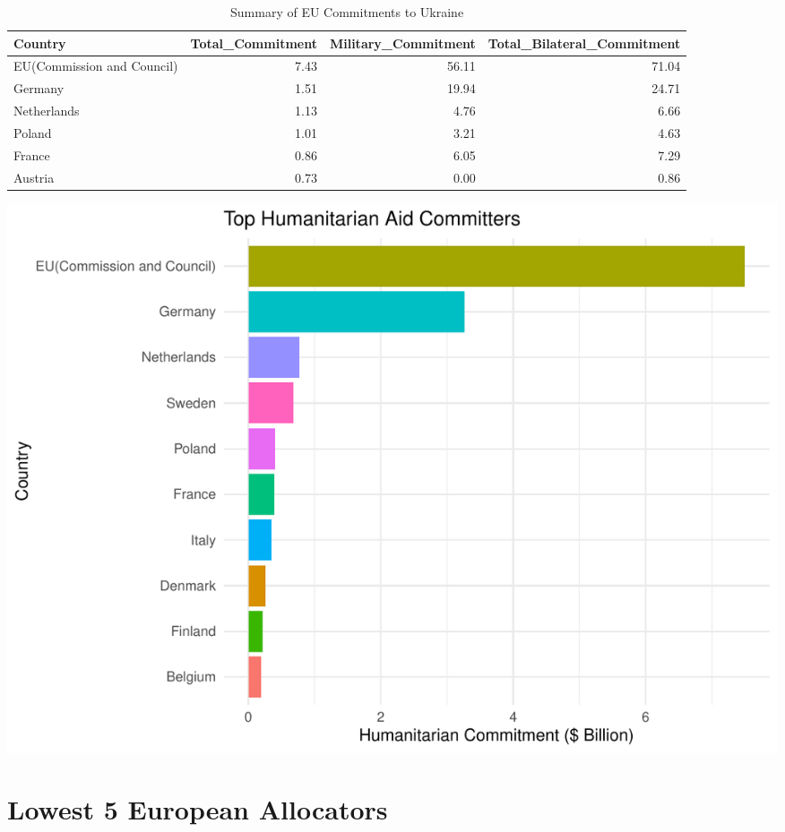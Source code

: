 \documentclass[12pt,preprint, authoryear]{elsarticle}
\let\origfigure\figure
\let\endorigfigure\endfigure
\renewenvironment{figure}[1][2] {
    \expandafter\origfigure\expandafter[H]
} {
    \endorigfigure
}
\numberwithin{equation}{section}
\numberwithin{figure}{section}
\numberwithin{table}{section}
\begin{document}
\begingroup\fontsize{11pt}{12pt}\selectfont
\begin{longtable}{lrrr}
\caption{Summary of EU Commitments to Ukraine \label{tab2}} \\ 
  \toprule
Country & Total\_Commitment & Military\_Commitment & Total\_Bilateral\_Commitment \\ 
  \midrule
EU(Commission and Council) & 7.43 & 56.11 & 71.04 \\ 
  Germany & 1.51 & 19.94 & 24.71 \\ 
  Netherlands & 1.13 & 4.76 & 6.66 \\ 
  Poland & 1.01 & 3.21 & 4.63 \\ 
  France & 0.86 & 6.05 & 7.29 \\ 
  Austria & 0.73 & 0.00 & 0.86 \\ 
   \bottomrule
\end{longtable}
\endgroup

\begin{figure}

{\centering \includegraphics{README_files/figure-latex/unnamed-chunk-2-1} 

}

\caption{Top 10 EU Countries Humanitarian Commitments to Ukraine\label{Figure2}}\label{fig:unnamed-chunk-2}
\end{figure}

\hypertarget{lowest-5-european-allocators}{%
\section{Lowest 5 European
Allocators}\label{lowest-5-european-allocators}}
\end{document}
